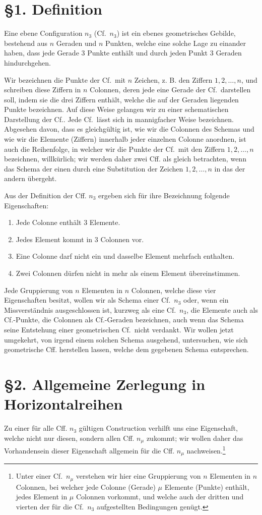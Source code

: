 \documentclass[11pt]{article}
\newcommand{\Cf}{\textup{Cf.}}
\begin{document}
\section*{\S 1. Definition}
Eine ebene Configuration $n_3$ (\Cf\ $n_3$) ist ein ebenes geometrisches Gebilde, bestehend aus $n$ Geraden und $n$ Punkten, welche eine solche Lage zu einander haben, dass jede Gerade 3 Punkte enthält und durch jeden Punkt 3 Geraden hindurchgehen.

Wir bezeichnen die Punkte der \Cf\ mit $n$ Zeichen, z. B. den Ziffern $1,2,\ldots,n$, und schreiben diese Ziffern in $n$ Colonnen, deren jede eine Gerade der \Cf\ darstellen soll, indem sie die drei Ziffern enthält, welche die auf der Geraden liegenden Punkte bezeichnen. Auf diese Weise gelangen wir zu einer schematischen Darstellung der \Cf. Jede \Cf\ lässt sich in mannigfacher Weise bezeichnen. Abgesehen davon, dass es gleichgültig ist, wie wir die Colonnen des Schemas und wie wir die Elemente (Ziffern) innerhalb jeder einzelnen Colonne anordnen, ist auch die Reihenfolge, in welcher wir die Punkte der \Cf\ mit den Ziffern $1,2,\ldots,n$ bezeichnen, willkürlich; wir werden daher zwei Cff. als gleich betrachten, wenn das Schema der einen durch eine Substitution der Zeichen $1,2,
\ldots,n$ in das der andern übergeht.

Aus der Definition der Cff. $n_3$ ergeben sich für ihre Bezeichnung folgende Eigenschaften:
\begin{enumerate}
\item Jede Colonne enthält 3 Elemente.
\item Jedes Element kommt in 3 Colonnen vor.
\item Eine Colonne darf nicht ein und dasselbe Element mehrfach enthalten.
\item Zwei Colonnen dürfen nicht in mehr als einem Element übereinstimmen.
\end{enumerate}

Jede Gruppierung von $n$ Elementen in $n$ Colonnen, welche diese vier Eigenschaften besitzt, wollen wir als Schema einer \Cf\ $n_3$ oder, wenn ein Missverständnis ausgeschlossen ist, kurzweg als eine \Cf\ $n_3$, die Elemente auch als \Cf-Punkte, die Colonnen als \Cf-Geraden bezeichnen, auch wenn das Schema seine Entstehung einer geometrischen \Cf\ nicht verdankt. Wir wollen jetzt umgekehrt, von irgend einem solchen Schema ausgehend, untersuchen, wie sich geometrische Cff. herstellen lassen, welche dem gegebenen Schema entsprechen.

\section*{\S 2. Allgemeine Zerlegung in Horizontalreihen}
Zu einer für alle Cff. $n_3$ gültigen Construction verhilft uns eine Eigenschaft, welche nicht nur diesen, sondern allen Cff. $n_\mu$ zukommt; wir wollen daher das Vorhandensein dieser Eigenschaft allgemein für die Cff. $n_\mu$ nachweisen.\footnote{Unter einer \Cf\ $n_\mu$ verstehen wir hier eine Gruppierung von $n$ Elementen in $n$ Colonnen, bei welcher jede Colonne (Gerade) $\mu$ Elemente (Punkte) enthält, jedes Element in $\mu$ Colonnen vorkommt, und welche auch der dritten und vierten der für die \Cf\ $n_3$ aufgestellten Bedingungen genügt.}
\end{document}
